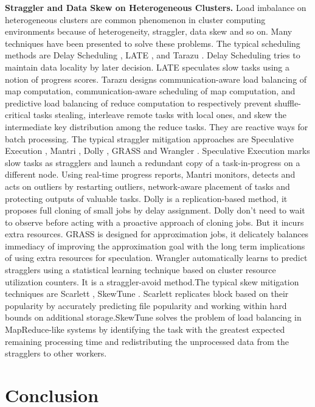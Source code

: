 \documentclass[10pt,conference,compsocconf,letterpaper]{IEEEtran}
\begin{document}
  \textbf{Straggler and Data Skew on Heterogeneous Clusters.} Load imbalance on heterogeneous clusters are common phenomenon in cluster computing environments because of heterogeneity, straggler, data skew and so on. Many techniques have been presented to solve these problems. The typical scheduling methods are Delay Scheduling \cite{Zaharia2010B}, LATE \cite{Zaharia2008}, and Tarazu \cite{Ahmad2012}. Delay Scheduling tries to maintain data locality by later decision. LATE speculates slow tasks using a notion of progress scores. Tarazu designs communication-aware load balancing of map computation, communication-aware scheduling of map computation, and predictive load balancing of reduce computation to respectively prevent shuffle-critical tasks stealing, interleave remote tasks with local ones, and skew the intermediate key distribution among the reduce tasks. They are reactive ways for batch processing. The typical straggler mitigation approaches are Speculative Execution \cite{Dean2004}, Mantri \cite{Ananthanarayanan2010}, Dolly \cite{Ananthanarayanan2013}, GRASS \cite{Ananthanarayanan2014} and Wrangler \cite{Yadwadkar2014}. Speculative Execution marks slow tasks as stragglers and launch a redundant copy of a task-in-progress on a different node. Using real-time progress reports, Mantri monitors, detects and acts on outliers by restarting outliers, network-aware placement of tasks and protecting outputs of valuable tasks. Dolly is a replication-based method, it proposes full cloning of small jobs by delay assignment. Dolly don't need to wait to observe before acting with a proactive approach of cloning jobs. But it incurs extra resources. GRASS is designed for approximation jobs, it delicately balances immediacy of improving the approximation goal with the long term implications of using extra resources for speculation. Wrangler automatically learns to predict stragglers using a statistical learning technique based on cluster resource utilization counters. It is a straggler-avoid method.The typical skew mitigation techniques are Scarlett \cite{Ananthanarayanan2011}, SkewTune \cite{Kwon2012}. Scarlett replicates block based on their popularity by accurately predicting file popularity and working within hard bounds on additional storage.SkewTune solves the problem of load balancing in MapReduce-like systems by identifying the task with the greatest expected remaining processing time and redistributing the unprocessed data from the stragglers to other workers.

\section{Conclusion}
\end{document}
